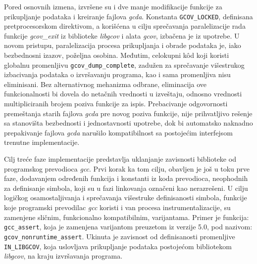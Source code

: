 \documentclass[12pt,oneside]{memoir}
\newcommand{\kod}[1]{\texttt{#1}}
\newcommand{\strano}[1]{\textit{#1}}
\begin{document}
Pored osnovnih izmena, izvršene su i dve manje modifikacije funkcije za prikupljanje podataka i kreiranje fajlova \strano{gcda}. Konstanta \kod{GCOV\_LOCKED}, definisana pretprocesorskom direktivom, a korišćena u cilju sprečavanja paralelizacije rada funkcije \strano{gcov\_exit} iz biblioteke \strano{libgcov} i alata \strano{gcov}, izbačena je iz upotrebe. U novom pristupu, paralelizacija procesa prikupljanja i obrade podataka je, iako bezbednosni izazov, poželjna osobina. Međutim, celokupni k\^{o}d koji koristi globalnu promenljivu \kod{gcov\_dump\_complete}, zadužen za sprečavanje višestrukog izbacivanja podataka o izvršavanju programa, kao i sama promenljiva nisu eliminisani. Bez alternativnog mehanizma odbrane, eliminacija ove funkcionalnosti bi dovela do netačnih vrednosti u izveštaju, odnosno vrednosti multipliciranih brojem poziva funkcije za ispis. Prebacivanje odgovornosti premeštanja starih fajlova \strano{gcda} pre novog poziva funkcije, nije prihvatljivo rešenje sa stanovišta bezbednosti i jednostavnosti upotrebe, dok bi automatsko naknadno prepakivanje fajlova \strano{gcda} narušilo kompatibilnost sa postojećim interfejsom trenutne implementacije. 

Cilj treće faze implementacije predstavlja uklanjanje zavisnosti biblioteke od programskog prevodioca \strano{gcc}. Prvi korak ka tom cilju, obavljen je još u toku prve faze, dodavanjem određenih funkcija i konstanti iz koda prevodioca, neophodnih za definisanje simbola, koji su u fazi linkovanja označeni kao nerazrešeni. U cilju logičkog osamostaljivanja i sprečavanja višestruke definisanosti simbola, funkcije koje programski prevodilac \strano{gcc} koristi i van procesa instrumentalizacije, su zamenjene sličnim, funkcionalno kompatibilnim, varijantama. Primer je funkcija: \kod{gcc\_assert}, koja je zamenjena varijantom preuzetom iz verzije 5.0, pod nazivom: \kod{gcov\_nonruntime\_assert}. Ukinuta je zavisnost od definisanosti promenljive \kod{IN\_LIBGCOV}, koja uslovljava prikupljanje podataka postojećom bibliotekom \strano{libgcov}, na kraju izvršavanja programa. 
\end{document}
